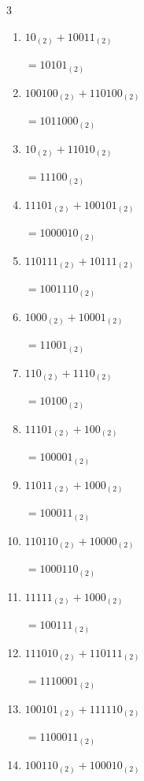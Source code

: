 \begin{multicols}{3}
\begin{enumerate}
        $=1000001_{(2)}$

  \item $10_{(2)} + 10011_{(2)}$

        $=10101_{(2)}$

  \item $100100_{(2)} + 110100_{(2)}$

        $=1011000_{(2)}$

  \item $10_{(2)} + 11010_{(2)}$

        $=11100_{(2)}$

\columnbreak %

  \item $11101_{(2)} + 100101_{(2)}$

        $=1000010_{(2)}$

  \item $110111_{(2)} + 10111_{(2)}$

        $=1001110_{(2)}$

  \item $1000_{(2)} + 10001_{(2)}$

        $=11001_{(2)}$

  \item $110_{(2)} + 1110_{(2)}$

        $=10100_{(2)}$

  \item $11101_{(2)} + 100_{(2)}$

        $=100001_{(2)}$

  \item $11011_{(2)} + 1000_{(2)}$

        $=100011_{(2)}$

  \item $110110_{(2)} + 10000_{(2)}$

        $=1000110_{(2)}$

  \item $11111_{(2)} + 1000_{(2)}$

        $=100111_{(2)}$

  \item $111010_{(2)} + 110111_{(2)}$

        $=1110001_{(2)}$

  \item $100101_{(2)} + 111110_{(2)}$

        $=1100011_{(2)}$

\columnbreak %

  \item $100110_{(2)} + 100010_{(2)}$


\end{enumerate}
\end{multicols}
